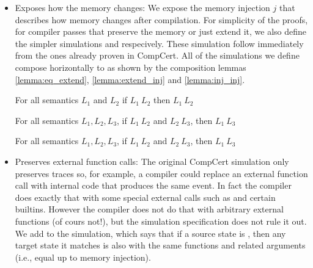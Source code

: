 \begin{itemize}
\item Exposes how the memory changes: We expose the memory injection $j$ that describes how memory changes after compilation. For simplicity of the proofs, for compiler passes that preserve the memory or just extend it, we also define the simpler simulations   and  respecively. These simulation follow immediately from the ones already proven in CompCert. All of the simulations we define compose horizontally to  as shown by the composition lemmas \ref{lemma:eq_extend}, \ref{lemma:extend_inj} and \ref{lemma:inj_inj}.

\begin{lemma}\label{lemma:eq_extend}
For all semantics $L_1$ and $L_2$ if  $L_1 \ L_2$ then  $L_1 \ L_2$\end{lemma} 
\begin{lemma}\label{lemma:extend_inj}
For all semantics $L_1, L_2, L_3$, if  $L_1 \ L_2$ and  $L_2 \ L_3$, then  $L_1 \ L_3$
\end{lemma} 
\begin{lemma}\label{lemma:inj_inj}
For all semantics $L_1, L_2, L_3$, if  $L_1 \ L_2$ and  $L_2 \ L_3$, then  $L_1 \ L_3$
\end{lemma} 


\item Preserves external function calls: The original CompCert simulation only preserves traces so, for example, a compiler could replace an external function call with internal code that produces the same event. In fact the compiler does exactly that with some special external calls such as  and certain builtins. However the compiler does not do that with arbitrary external functions (of cours not!), but the simulation specification does not rule it out.  We add  to the simulation, which says that if a source state is , then any target state it matches is also  with the same functions and related arguments (i.e., equal up to memory injection).  


\end{itemize}
